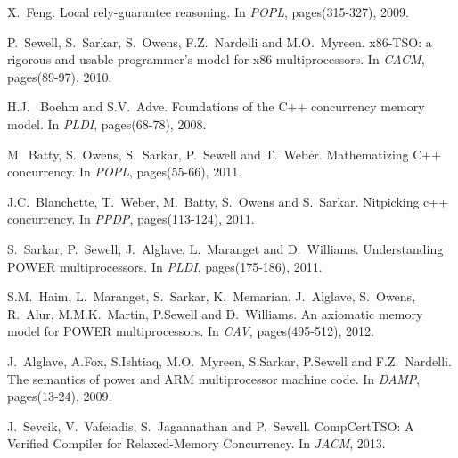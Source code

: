 \documentclass[preprint,9pt]{sigplanconf}
\begin{document}
\begin{thebibliography}{10}
{
X.~Feng.
\newblock Local rely-guarantee reasoning.
\newblock In {\em POPL}, pages(315-327), 2009.

P.~Sewell, S.~Sarkar, S.~Owens, F.Z.~Nardelli and M.O.~Myreen.
\newblock x86-TSO: a rigorous and usable programmer's model for x86 multiprocessors.
\newblock In {\em CACM}, pages(89-97), 2010.

H.J.~ Boehm and S.V.~Adve.
\newblock Foundations of the C++ concurrency memory model.
\newblock In {\em PLDI}, pages(68-78), 2008.

M.~Batty, S.~Owens, S.~Sarkar, P.~Sewell and T.~Weber.
\newblock Mathematizing C++ concurrency.
\newblock In {\em POPL}, pages(55-66), 2011.

J.C.~Blanchette, T.~Weber, M.~Batty, S.~Owens and S.~Sarkar.
\newblock Nitpicking c++ concurrency.
\newblock In {\em PPDP}, pages(113-124), 2011.

S.~Sarkar, P.~Sewell, J.~Alglave, L.~Maranget and D.~Williams.
\newblock Understanding POWER multiprocessors.
\newblock In {\em PLDI}, pages(175-186), 2011.

S.M.~Haim, L.~Maranget, S.~Sarkar, K.~Memarian, J.~Alglave, S.~Owens, R.~Alur, M.M.K.~Martin, P.Sewell and D.~Williams.
\newblock An axiomatic memory model for POWER multiprocessors.
\newblock In {\em CAV}, pages(495-512), 2012.

J.~Alglave, A.Fox, S.Ishtiaq, M.O.~Myreen, S.Sarkar, P.Sewell and F.Z.~Nardelli.
\newblock The semantics of power and ARM multiprocessor machine code.
\newblock In {\em DAMP}, pages(13-24), 2009.

J.~Sevcik, V.~Vafeiadis, S.~Jagannathan and P.~Sewell.
\newblock CompCertTSO: A Verified Compiler for Relaxed-Memory Concurrency.
\newblock In {\em JACM}, 2013.

}


\end{thebibliography}




%
\end{document}
